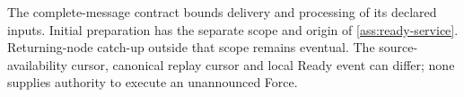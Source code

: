 \documentclass[11pt,a4paper]{article}
\begin{document}
The complete-message contract bounds delivery and processing of its
declared inputs. Initial preparation has the separate scope and origin
of \cref{ass:ready-service}. Returning-node catch-up outside that scope
remains eventual. The source-availability cursor, canonical replay
cursor and local Ready event can differ; none supplies authority to
execute an unannounced Force.
\end{document}
